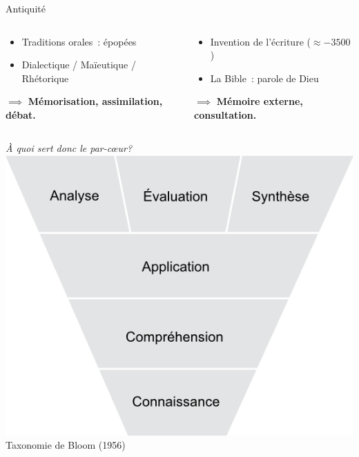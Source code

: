 \begin{frame}{Antiquité}
\begin{columns}
\end{columns}
\begin{columns}
	\begin{column}{0.49\linewidth}
		\begin{itemize}
			\item Traditions orales~: épopées
			\item Dialectique / Maïeutique / Rhétorique
		\end{itemize}
		$\implies$ \textbf{Mémorisation, assimilation, débat.}
	\end{column}
	\begin{column}{0.49\linewidth}
		\begin{itemize}
			\item Invention de l'écriture ($\approx -3500$)
			\item La Bible~: parole de Dieu
		\end{itemize}
		$\implies$ \textbf{Mémoire externe, consultation.}
	\end{column}
\end{columns}
\end{frame}
\begin{frame}

\centering
\Huge \emph{À quoi sert donc le par-c\oe{}ur?}
\vfill
\centering
\includegraphics[height=0.5\paperheight]{../resources/illustrations/bloom} \\
\vfill \hfill
\large Taxonomie de Bloom (1956) \hfill \hfill
\end{frame}

